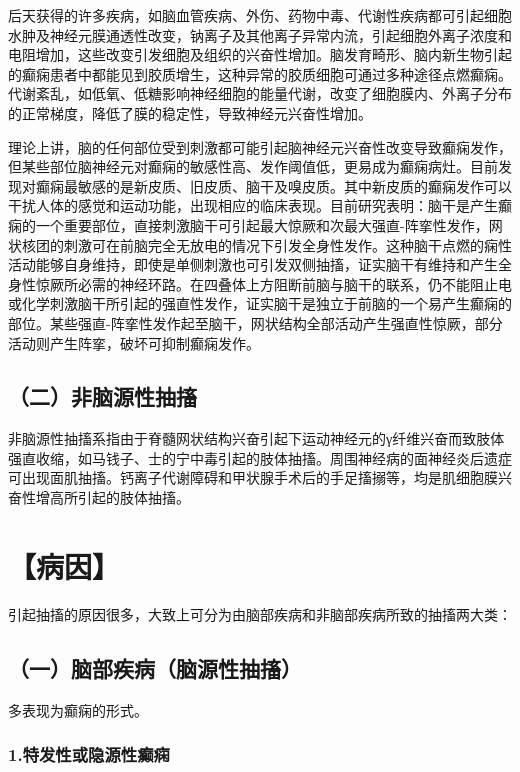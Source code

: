 后天获得的许多疾病，如脑血管疾病、外伤、药物中毒、代谢性疾病都可引起细胞水肿及神经元膜通透性改变，钠离子及其他离子异常内流，引起细胞外离子浓度和电阻增加，这些改变引发细胞及组织的兴奋性增加。脑发育畸形、脑内新生物引起的癫痫患者中都能见到胶质增生，这种异常的胶质细胞可通过多种途径点燃癫痫。代谢紊乱，如低氧、低糖影响神经细胞的能量代谢，改变了细胞膜内、外离子分布的正常梯度，降低了膜的稳定性，导致神经元兴奋性增加。

理论上讲，脑的任何部位受到刺激都可能引起脑神经元兴奋性改变导致癫痫发作，但某些部位脑神经元对癫痫的敏感性高、发作阈值低，更易成为癫痫病灶。目前发现对癫痫最敏感的是新皮质、旧皮质、脑干及嗅皮质。其中新皮质的癫痫发作可以干扰人体的感觉和运动功能，出现相应的临床表现。目前研究表明：脑干是产生癫痫的一个重要部位，直接刺激脑干可引起最大惊厥和次最大强直-阵挛性发作，网状核团的刺激可在前脑完全无放电的情况下引发全身性发作。这种脑干点燃的痫性活动能够自身维持，即使是单侧刺激也可引发双侧抽搐，证实脑干有维持和产生全身性惊厥所必需的神经环路。在四叠体上方阻断前脑与脑干的联系，仍不能阻止电或化学刺激脑干所引起的强直性发作，证实脑干是独立于前脑的一个易产生癫痫的部位。某些强直-阵挛性发作起至脑干，网状结构全部活动产生强直性惊厥，部分活动则产生阵挛，破坏可抑制癫痫发作。

\subsection{（二）非脑源性抽搐}

非脑源性抽搐系指由于脊髓网状结构兴奋引起下运动神经元的γ纤维兴奋而致肢体强直收缩，如马钱子、士的宁中毒引起的肢体抽搐。周围神经病的面神经炎后遗症可出现面肌抽搐。钙离子代谢障碍和甲状腺手术后的手足搐搦等，均是肌细胞膜兴奋性增高所引起的肢体抽搐。

\section{【病因】}

引起抽搐的原因很多，大致上可分为由脑部疾病和非脑部疾病所致的抽搐两大类：

\subsection{（一）脑部疾病（脑源性抽搐）}

多表现为癫痫的形式。

\subsubsection{1.特发性或隐源性癫痫}

